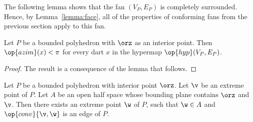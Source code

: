 The following lemma shows that the fan $(V_P,E_P)$ is completely
surrounded.  Hence, by Lemma~\ref{lemma:face}, all of the properties
of conforming fans from the previous section apply to this fan.

\begin{lemma}[]\cutrate{} 
Let $P$ be a bounded polyhedron
with $\orz$ as an interior point.  Then $\op{azim}(x) < \pi$ for
every dart $x$ in the hypermap $\op{hyp}(V_P,E_P)$.
\end{lemma}
%
%
%
%

\begin{proof}  The result is a consequence of the
lemma that follows.
\end{proof}

\begin{lemma}[]
  Let $P$ be a bounded polyhedron with interior point $\orz$.
  Let $\v$ be an extreme point of $P$.  Let $A$ be an open half space
  whose bounding plane contains $\orz$ and $\v$.  Then there exists an
  extreme point $\w$ of $P$, such that $\w\in A$ and
  $\op{conv}\{\v,\w\}$ is an edge of $P$.
\end{lemma}

